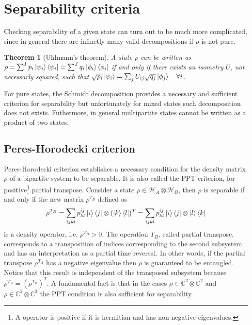 \documentclass[10pt,a4paper]{book}
\numberwithin{equation}{chapter}
\numberwithin{figure}{chapter}
\numberwithin{table}{chapter}
\newtheorem{theorem}{Theorem}[section]
\begin{document}
\section{Separability criteria}
Checking separability of a given state can turn out to be much more complicated, since in general there are infinetly many valid decompositions if $\rho$ is not pure. 

\begin{theorem}[Uhlmann's theorem]A state $\rho$ can be written as $\rho = \sum^{I} p_i \ket{\psi_i}\bra{\psi_i}=\sum^{J} q_i \ket{\phi_i}\bra{\phi_i}$ if and only if there exists an isometry $U$, not necessarly squared, such that $\sqrt{p_i}\ket{\psi_i}=\sum_j U_{ij}\sqrt{q_j}\ket{\phi_j} \quad \forall i$.
\label{uhlmann} 
\end{theorem}

For pure states, the Schmidt decomposition provides a necessary and sufficient criterion for separability but unfortunately for mixed states such decomposition does not exists. Futhermore, in general multipartite states cannot be written as a product of two states.

\subsection{Peres-Horodecki criterion}
Peres-Horodecki criterion \cite{peres}\cite{horo} establishes a necessary condition for the density matrix $\rho$ of a bipartite system to be separable. It is also called the PPT criterion, for positive\footnote{A operator is positive if it is hermitian and has non-negative eigenvalues.} partial transpose. Consider a state $\rho \in \mathcal{H}_A\otimes \mathcal{H}_B$, then $\rho$ is separable if and only if the new matrix $\rho^{T_B}$ defined as
\begin{equation}
\rho^{T_B}= \sum_{ijkl} p^{ij}_{kl} \ket{i}\bra{j} \otimes (\ket{k}\bra{l} )^{T}= \sum_{ijkl} p^{ij}_{kl} \ket{i}\bra{j} \otimes \ket{l}\bra{k} 
\end{equation}
is a density operator, i.e. $\rho^{T_B} > 0$. The operation $T_B$, called partial transpose, corresponds to a transposition of indices corresponding to the second subsystem and has an interpretation as a partial time reversal. In other words, if the partial transpose $\rho^{T_A}$ has a negative eigenvalue then $\rho$ is guaranteed to be entangled. Notice that this result is independent of the transposed subsystem because $\rho^{T_A}=(\rho^{T_B})^T$. A fundamental fact is that in the cases $\rho \in \mathbb{C}^2 \otimes \mathbb{C}^2$ and $\rho \in \mathbb{C}^2 \otimes \mathbb{C}^3$ the PPT condition is also sufficient for separability.
\end{document}
